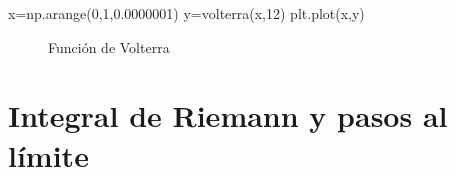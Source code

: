 \begin{pyverbatim}
x=np.arange(0,1,0.0000001)
y=volterra(x,12)
plt.plot(x,y)
\end{pyverbatim}


 \begin{figure}[h]
 \begin{center}
 \caption{Función de Volterra}
\end{center}
 \end{figure}


\section{Integral de Riemann y pasos al límite}

